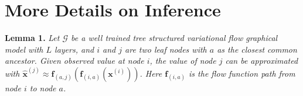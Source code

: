 \documentclass{article}
\begin{document}
\section{More Details on Inference}

\textbf{Lemma 1.} {\it Let $\mathcal{G}$ be a well trained tree structured variational flow graphical model with $L$ layers, and $i$ and $j$ are two leaf nodes with $a$ as the closest common ancestor. 
Given observed value at node $i$, the value of node $j$ can be approximated with $\widehat{\mathbf{x}}^{(j)} \approx  \mathbf{f}_{(a,j)}(\mathbf{f}_{(i, a)}(\mathbf{x}^{(i)}))$. Here $\mathbf{f}_{(i, a)}$ is the flow function path from node $i$ to node $a$. 
}
\end{document}
